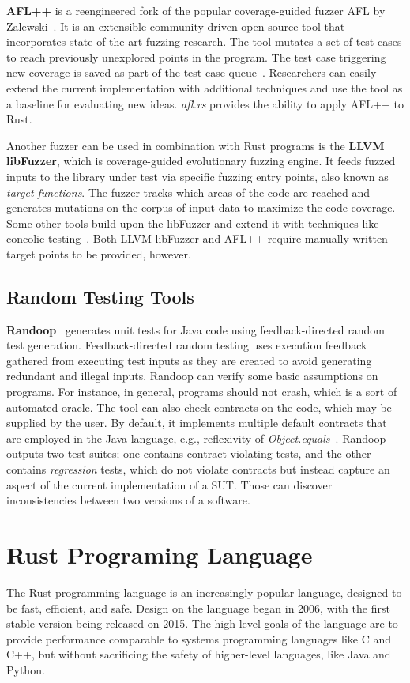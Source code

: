 \documentclass{article}
\begin{document}
\textbf{AFL++} is a reengineered fork of the popular coverage-guided fuzzer AFL by Zalewski~\cite{Zalewski2014}. It is an extensible community-driven open-source tool that incorporates state-of-the-art fuzzing research. The tool mutates a set of test cases to reach previously unexplored points in the program. The test case triggering new coverage is saved as part of the test case queue~\cite{Fioraldi2020}. Researchers can easily extend the current implementation with additional techniques and use the tool as a baseline for evaluating new ideas. \textit{afl.rs} provides the ability to apply AFL++ to Rust.

Another fuzzer can be used in combination with Rust programs is the \textbf{LLVM libFuzzer}, which is coverage-guided evolutionary fuzzing engine. It feeds fuzzed inputs to the library under test via specific fuzzing entry points, also known as \textit{target functions}. The fuzzer tracks which areas of the code are reached and generates mutations on the corpus of input data to maximize the code coverage. Some other tools build upon the libFuzzer and extend it with techniques like concolic testing~\cite{Rocha2020,Le2019}. Both LLVM libFuzzer and AFL++ require manually written target points to be provided, however.

\subsection{Random Testing Tools}
\textbf{Randoop}~\cite{Pacheco_2007} generates unit tests for Java code using feedback-directed random test generation. Feedback-directed random testing uses execution feedback gathered from executing test inputs as they are created to avoid generating redundant and illegal inputs. Randoop can verify some basic assumptions on programs. For instance, in general, programs should not crash, which is a sort of automated oracle. The tool can also check  contracts on the code, which may be supplied by the user. By default, it implements multiple default contracts that are employed in the Java language, e.g., reflexivity of \textit{Object.equals}~\cite{Fraser2013}. Randoop outputs two test suites; one contains contract-violating tests, and the other contains \textit{regression} tests, which do not violate contracts but instead capture an aspect of the current implementation of a \ac{SUT}. Those can discover inconsistencies between two versions of a software.

\newpage
\section{Rust Programing Language}
The Rust programming language is an increasingly popular language, designed to be fast, efficient, and safe. Design on the language began in 2006, with the first stable version being released on 2015. The high level goals of the language are to provide performance comparable to systems programming languages like C and C++, but without sacrificing the safety of higher-level languages, like Java and Python.
\end{document}
